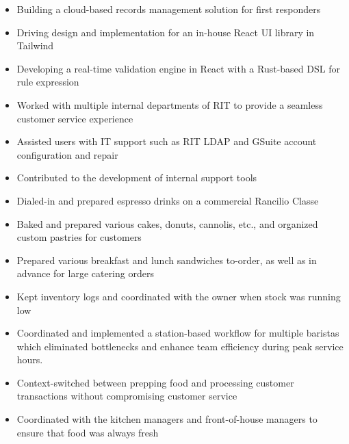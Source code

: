 \begin{itemize}
  \item Building a cloud-based records management solution for first responders
  \item Driving design and implementation for an in-house React UI library in Tailwind
  \item Developing a real-time validation engine in React with a Rust-based DSL for rule expression
\end{itemize}

\divider

\begin{itemize}
  \item Worked with multiple internal departments of RIT to provide a seamless customer service experience
  \item Assisted users with IT support such as RIT LDAP and GSuite account configuration and repair
  \item Contributed to the development of internal support tools
\end{itemize}

\divider

\begin{itemize}
  \item Dialed-in and prepared espresso drinks on a commercial Rancilio Classe
  \item Baked and prepared various cakes, donuts, cannolis, etc., and organized custom pastries for customers
  \item Prepared various breakfast and lunch sandwiches to-order, as well as in advance for large catering orders
  \item Kept inventory logs and coordinated with the owner when stock was running low
  \item Coordinated and implemented a station-based workflow for multiple baristas which eliminated bottlenecks and enhance team efficiency during peak service hours.
\end{itemize}

\divider

\begin{itemize}
  \item Context-switched between prepping food and processing customer transactions without compromising customer service
  \item Coordinated with the kitchen managers and front-of-house managers to ensure that food was always fresh
\end{itemize}